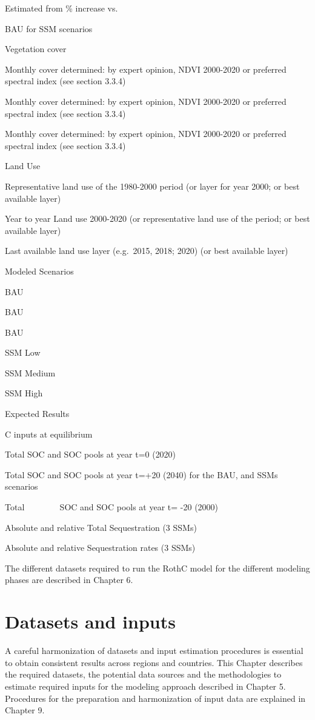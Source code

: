 \documentclass[
  10pt,
  b5paper,
]{book}
\begin{document}
Estimated from \% increase vs.~

BAU for SSM scenarios

Vegetation cover

Monthly cover determined: by expert opinion, NDVI 2000-2020 or preferred spectral index (see section 3.3.4)

Monthly cover determined: by expert opinion, NDVI 2000-2020 or preferred spectral index (see section 3.3.4)

Monthly cover determined: by expert opinion, NDVI 2000-2020 or preferred spectral index (see section 3.3.4)

Land Use

Representative land use of the 1980-2000 period (or layer for year 2000; or best available layer)

Year to year Land use 2000-2020 (or representative land use of the period; or best available layer)

Last available land use layer (e.g.~2015, 2018; 2020) (or best available layer)

Modeled Scenarios

BAU

BAU

BAU

SSM Low

SSM Medium

SSM High

Expected Results

C inputs at equilibrium

Total SOC and SOC pools at year t=0 (2020)

Total SOC and SOC pools at year t=+20 (2040) for the BAU, and SSMs scenarios

Total~ ~ ~ ~ ~ SOC and SOC pools at year t= -20 (2000)

Absolute and relative Total Sequestration (3 SSMs)

Absolute and relative Sequestration rates (3 SSMs)

The different datasets required to run the RothC model for the different modeling phases are described in Chapter 6.

\hypertarget{datasets-and-inputs}{%
\chapter{\textbar{} Datasets and inputs}\label{datasets-and-inputs}}

A careful harmonization of datasets and input estimation procedures is essential to obtain consistent results across regions and countries. This Chapter describes the required datasets, the potential data sources and the methodologies to estimate required inputs for the modeling approach described in Chapter 5. Procedures for the preparation and harmonization of input data are explained in Chapter 9.
\end{document}
